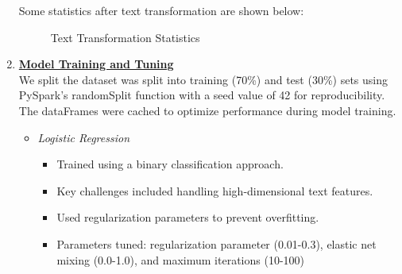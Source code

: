 \documentclass[9pt]{article}
\begin{document}
\begin{enumerate}
  Some statistics after text transformation are shown below:
  \begin{figure}[H]
      \centering
      \hspace{0.02\textwidth}
      \caption{Text Transformation Statistics}
      \label{fig:feature_engineering_statistics}
  \end{figure}
  \item \textbf{\underline{Model Training and Tuning}}\\
  We split the dataset was split into training (70\%) and test (30\%) sets using PySpark's randomSplit function with a seed value of 42 for reproducibility. The dataFrames were cached to optimize performance during model training.
  \begin{itemize}
    \item \textit{Logistic Regression} 
    \begin{itemize}
      \item Trained using a binary classification approach.
      \item Key challenges included handling high-dimensional text features.
      \item Used regularization parameters to prevent overfitting.
      \item Parameters tuned: regularization parameter (0.01-0.3), elastic net mixing (0.0-1.0), and maximum iterations (10-100)
    \end{itemize}

\end{itemize}
\end{enumerate}
\end{document}
